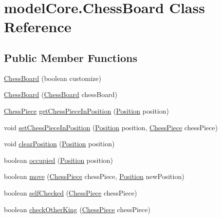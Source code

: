 \hypertarget{classmodel_core_1_1_chess_board}{\section{model\+Core.\+Chess\+Board Class Reference}
\label{classmodel_core_1_1_chess_board}
}
\subsection*{Public Member Functions}
\begin{DoxyCompactItemize}
\item 
\hyperlink{classmodel_core_1_1_chess_board_a41fb4f578e381151b7d585e3264fa778}{Chess\+Board} (boolean customize)
\item 
\hyperlink{classmodel_core_1_1_chess_board_a74d33500fe30c1441989710578d9725d}{Chess\+Board} (\hyperlink{classmodel_core_1_1_chess_board}{Chess\+Board} chess\+Board)
\item 
\hyperlink{classmodel_chess_pieces_1_1_chess_piece}{Chess\+Piece} \hyperlink{classmodel_core_1_1_chess_board_ad700d180ac71927b8fd0e5c3e09ddd2b}{get\+Chess\+Piece\+In\+Position} (\hyperlink{classmodel_core_1_1_position}{Position} position)
\item 
void \hyperlink{classmodel_core_1_1_chess_board_af1a00d0d402bde8b8b5e5a23a96e6374}{set\+Chess\+Piece\+In\+Position} (\hyperlink{classmodel_core_1_1_position}{Position} position, \hyperlink{classmodel_chess_pieces_1_1_chess_piece}{Chess\+Piece} chess\+Piece)
\item 
void \hyperlink{classmodel_core_1_1_chess_board_a59800c1635a93d08909d34814bfffd20}{clear\+Position} (\hyperlink{classmodel_core_1_1_position}{Position} position)
\item 
boolean \hyperlink{classmodel_core_1_1_chess_board_abf420a5f1ea25fe7a8c6cdce3427c0af}{occupied} (\hyperlink{classmodel_core_1_1_position}{Position} position)
\item 
boolean \hyperlink{classmodel_core_1_1_chess_board_ab9216efa0fa5ce7794f813a500887647}{move} (\hyperlink{classmodel_chess_pieces_1_1_chess_piece}{Chess\+Piece} chess\+Piece, \hyperlink{classmodel_core_1_1_position}{Position} new\+Position)
\item 
boolean \hyperlink{classmodel_core_1_1_chess_board_aed20e0cd69a469134238b8ce28403e76}{self\+Checked} (\hyperlink{classmodel_chess_pieces_1_1_chess_piece}{Chess\+Piece} chess\+Piece)
\item 
boolean \hyperlink{classmodel_core_1_1_chess_board_a65d2495b5efc7db5a62e8af13ca0dda0}{check\+Other\+King} (\hyperlink{classmodel_chess_pieces_1_1_chess_piece}{Chess\+Piece} chess\+Piece)

\end{DoxyCompactItemize}
